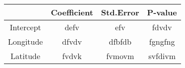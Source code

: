 \documentclass{article}
\begin{document}
    \newpage

    \begin{center}
        \begin{tabular}{cccc}
            \toprule
            {} & Coefficient & Std.Error & P-value \\
            \midrule
            Intercept & defv & efv & fdvdv \\
            Longitude & dfvdv & dfbfdb & fgngfng \\
            Latitude & fvdvk & fvmovm & svfdivm  \\
            \bottomrule
        \end{tabular}
    \end{center}   

    \printbibliography
\end{document}
